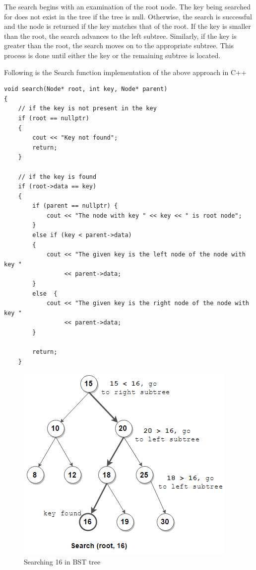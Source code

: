 \documentclass[11pt]{article}
\begin{document}
        The search begins with an examination of the root node. The key being searched for does not exist in the tree if the tree is null. Otherwise, the search is successful and the node is returned if the key matches that of the root. If the key is smaller than the root, the search advances to the left subtree. Similarly, if the key is greater than the root, the search moves on to the appropriate subtree. This process is done until either the key or the remaining subtree is located.\newline

Following is the Search function implementation of the above approach in C++
\begin{lstlisting}
void search(Node* root, int key, Node* parent)
{
    // if the key is not present in the key
    if (root == nullptr)
    {
        cout << "Key not found";
        return;
    }
 
    // if the key is found
    if (root->data == key)
    {
        if (parent == nullptr) {
            cout << "The node with key " << key << " is root node";
        }
        else if (key < parent->data)
        {
            cout << "The given key is the left node of the node with key "
                 << parent->data;
        }
        else  {
            cout << "The given key is the right node of the node with key "
                 << parent->data;
        }
 
        return;
    }
\end{lstlisting}

        \begin{figure}[H]
            \centering
            \includegraphics[scale=0.7]{BSTSearch.png}
            \caption{Searching 16 in BST tree}\label{BSTSearch}
        \end{figure}
        
\end{document}
